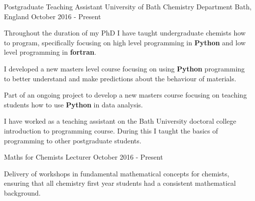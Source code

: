\begin{cventries}
  \cventry
    {Postgraduate Teaching Assistant}
    {University of Bath Chemistry Department}    
    {Bath, England}
    {October 2016 - Present}
    {
      \begin{cvitems}
        \item{Throughout the duration of my PhD I have taught undergraduate chemists how to program, specifically focusing on high level programming in \textbf{Python} and low level programming in \textbf{fortran}.}
        \item{I developed a new masters level course focusing on using \textbf{Python} programming to better understand and make predictions about the behaviour of materials.}
        \item{Part of an ongoing project to develop a new masters course focusing on teaching students how to use \textbf{Python} in data analysis.}
        \item I have worked as a teaching assistant on the Bath University doctoral college introduction to programming course. During this I taught the basics of programming to other postgraduate students. 
      \end{cvitems}
    }

  \cventry   
    {Maths for Chemists Lecturer}
    {}
    {}
    {October 2016 - Present}
    {
      \begin{cvitems}
        \item
        {Delivery of workshops in fundamental mathematical concepts for chemists, ensuring that all chemistry first year students had a consistent mathematical background.} 
      \end{cvitems}
    }

\end{cventries}